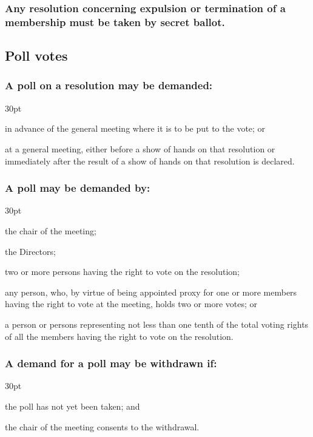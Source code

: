 \documentclass[12pt]{article}
\def\clauseindent{30pt}
\newenvironment{subindentpara}{\begin{adjustwidth}{\clauseindent}{}\begin{hanginglist}}{\end{hanginglist}\end{adjustwidth}}
\begin{document}
\subsubsection[Votes on expulsion/termination by secret ballot only]{Any resolution concerning expulsion or termination of a membership must be taken by secret ballot.}

\subsection{Poll votes}
\subsubsection[Specifics of poll on resolution]{A poll on a resolution may be demanded:}
\begin{subindentpara}
    \item in advance of the general meeting where it is to be put to the vote; or
    \item at a general meeting, either before a show of hands on that resolution or immediately after the result of a show of hands on that resolution is declared.
\end{subindentpara}
\subsubsection[Specifics of poll demand]{A poll may be demanded by:}
\begin{subindentpara}
    \item the chair of the meeting;
    \item the Directors;
    \item two or more persons having the right to vote on the resolution;
    \item any person, who, by virtue of being appointed proxy for one or more members having the right to vote at the meeting, holds two or more votes; or
    \item a person or persons representing not less than one tenth of the total voting rights of all the members having the right to vote on the resolution.
\end{subindentpara}
\subsubsection[Specifcs of withdrawal of poll demand]{A demand for a poll may be withdrawn if:}
\begin{subindentpara}
    \item the poll has not yet been taken; and
    \item the chair of the meeting consents to the withdrawal.
\end{subindentpara}
\end{document}
